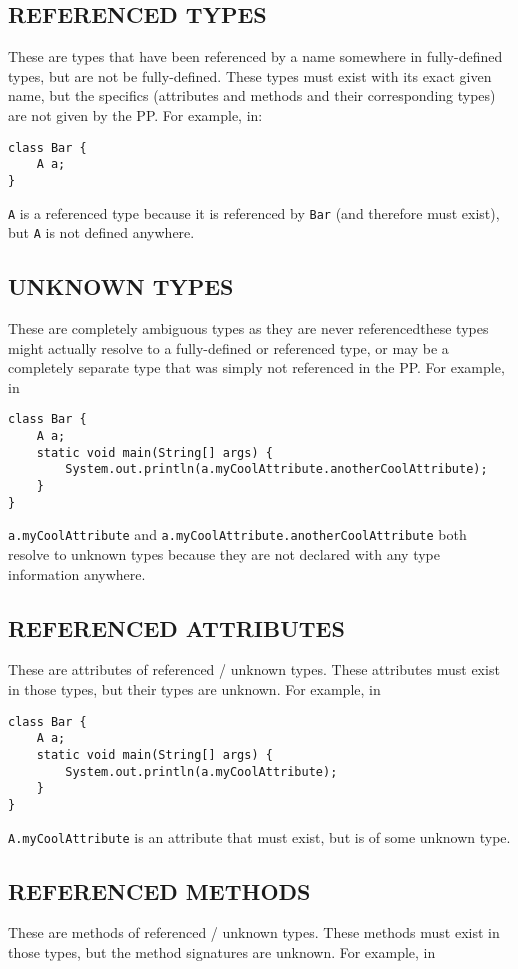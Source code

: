 \documentclass{article}
\begin{document}
\subsection{REFERENCED TYPES}
These are types that have been referenced by a name somewhere in fully-defined types,
but are not be fully-defined. These types must exist with its exact given name,
but the specifics (attributes and methods and their corresponding types) are not given
by the PP.
For example, in:
\begin{verbatim}
class Bar {
    A a;
}
\end{verbatim}
\noindent\texttt{A} is a referenced type because it is referenced by
\texttt{Bar} (and therefore must exist), but \texttt{A}
is not defined anywhere.

\subsection{UNKNOWN TYPES}
These are completely ambiguous types as they are never referenced\textemdash these
types might actually resolve to a fully-defined or referenced type,
or may be a completely separate type that was simply not referenced in the PP.
For example, in

\begin{verbatim}
class Bar {
    A a;
    static void main(String[] args) {
        System.out.println(a.myCoolAttribute.anotherCoolAttribute);
    }
}
\end{verbatim}

\noindent\texttt{a.myCoolAttribute} and
\texttt{a.myCoolAttribute.anotherCoolAttribute} both resolve to unknown
types because they are not declared with any type information anywhere.

\subsection{REFERENCED ATTRIBUTES}
These are attributes of referenced / unknown types. These attributes must exist
in those types, but their types are unknown.
For example, in
\begin{verbatim}
class Bar {
    A a;
    static void main(String[] args) {
        System.out.println(a.myCoolAttribute);
    }
}
\end{verbatim}

\noindent\texttt{A.myCoolAttribute} is an attribute that must exist,
but is of some unknown type.

\subsection{REFERENCED METHODS}
These are methods of referenced / unknown types.
These methods must exist in those types, but the method signatures are unknown.
For example, in
\end{document}
